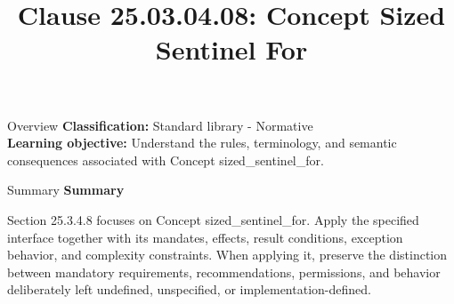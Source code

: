 \documentclass[10pt,letterpaper]{article}
\title{Clause 25.03.04.08: Concept Sized Sentinel For}
\author{}
\date{}
\begin{document}
\maketitle
\begin{CornellOverviewBox}{Overview}
\textbf{Classification:} Standard library - Normative\\[2pt]
\textbf{Learning objective:} Understand the rules, terminology, and semantic consequences associated with Concept sized\_sentinel\_for.
\end{CornellOverviewBox}\begin{CornellSummaryBox}{Summary}
{\sffamily\bfseries\color{Accent} Summary}\par\vspace{3pt}Section 25.3.4.8 focuses on Concept sized\_sentinel\_for. Apply the specified interface together with its mandates, effects, result conditions, exception behavior, and complexity constraints. When applying it, preserve the distinction between mandatory requirements, recommendations, permissions, and behavior deliberately left undefined, unspecified, or implementation-defined.
\end{CornellSummaryBox}
\end{document}
